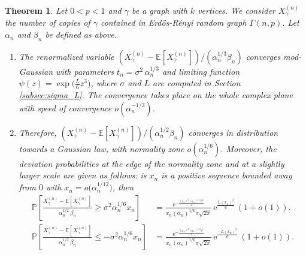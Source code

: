 \documentclass[12pt,a4paper,reqno]{amsart}
\newtheorem{theorem}[lemma]{Theorem}
\theoremstyle{remark}
\newcommand{\E}{\mathrm{e}}
\newcommand{\esper}{\mathbb{E}}
\newcommand{\proba}{\mathbb{P}}
\newcommand{\alphan}{\alpha_n}
\newcommand{\betan}{\beta_n}
\newcommand{\SubGraph}{X^{(n)}}
\begin{document}
\begin{theorem} \label{thm:moddevgraphs}
    Let $0<p<1$ and $\gamma$ be a graph with $k$ vertices. We consider $\SubGraph_\gamma$ the number
    of copies of $\gamma$ contained in Erd\"os-R\'enyi random graph $\Gamma(n,p)$. Let $\alphan$ and $\betan$ be defined as above.\vspace{2mm}
\begin{enumerate}
\item The renormalized variable 
    $(\SubGraph_\gamma - \esper[\SubGraph_\gamma])/(\alphan^{1/3} \betan)$
    converges mod-Gaussian with parameters $t_{n}=\sigma^{2}\,\alphan^{1/3}$
    and limiting function $\psi(z)=\exp\big(\frac{L}{6} z^{3}\big)$,
    where $\sigma$ and $L$ are computed in Section \ref{subsec:sigma_L}.
The convergence takes place on the whole complex plane with speed of convergence $o(\alphan^{-1/3})$.
\vspace{2mm}

\item Therefore, $(\SubGraph_\gamma - \esper[\SubGraph_\gamma])/(\alphan^{1/2} \betan)$ converges in distribution
towards a Gaussian law, with normality zone $o(\alphan^{1/6})$.
Moreover, the deviation probabilities at the edge of the normality zone and at a slightly larger scale 
are given as follows:
is $x_n$ is a positive sequence bounded away from $0$ with $x_n=o\big(\alphan^{1/12})$, then
\begin{align*}
        \proba \left[ \frac{\SubGraph_\gamma - \esper[\SubGraph_\gamma]}    
        {\alphan^{1/2} \, \betan} \geq \sigma^2 \alphan^{1/6} x_n \right] &=
\frac{\E^{-\frac{(x_n)^2(\alphan)^{1/3}\sigma^2}{2}}}{x_n(\alphan)^{1/6}\sigma \sqrt{2\pi}}\,\E^{\frac{L(x_n)^3}{6}}\,(1+o(1)).\\
        \proba \left[ \frac{\SubGraph_\gamma - \esper[\SubGraph_\gamma]}    
        {\alphan^{1/2} \, \betan} \leq - \sigma^2 \alphan^{1/6} x_n \right] &=
\frac{\E^{-\frac{(x_n)^2(\alphan)^{1/3}\sigma^2}{2}}}{x_n(\alphan)^{1/6}\sigma \sqrt{2\pi}}\,\E^{\frac{-L(x_n)^3}{6}}\,(1+o(1)).
\end{align*}
    \end{enumerate}
\end{theorem}
\smallskip
\end{document}
